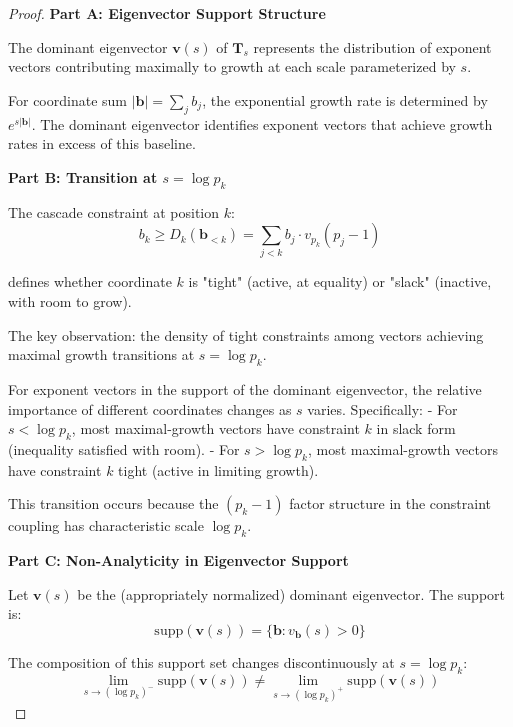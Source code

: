 \begin{proof}

\noindent \textbf{Part A: Eigenvector Support Structure}

The dominant eigenvector $\mathbf{v}(s)$ of $\mathbf{T}_s$ represents the distribution of exponent vectors contributing maximally to growth at each scale parameterized by $s$.

For coordinate sum $|\mathbf{b}| = \sum_j b_j$, the exponential growth rate is determined by $e^{s |\mathbf{b}|}$. The dominant eigenvector identifies exponent vectors that achieve growth rates in excess of this baseline.

\noindent \textbf{Part B: Transition at $s = \log p_k$}

The cascade constraint at position $k$:
\begin{equation}
b_k \geq D_k(\mathbf{b}_{<k}) = \sum_{j < k} b_j \cdot v_{p_k}(p_j - 1)
\end{equation}

defines whether coordinate $k$ is "tight" (active, at equality) or "slack" (inactive, with room to grow).

The key observation: the density of tight constraints among vectors achieving maximal growth transitions at $s = \log p_k$.

For exponent vectors in the support of the dominant eigenvector, the relative importance of different coordinates changes as $s$ varies. Specifically:
- For $s < \log p_k$, most maximal-growth vectors have constraint $k$ in slack form (inequality satisfied with room).
- For $s > \log p_k$, most maximal-growth vectors have constraint $k$ tight (active in limiting growth).

This transition occurs because the $(p_k-1)$ factor structure in the constraint coupling has characteristic scale $\log p_k$.

\noindent \textbf{Part C: Non-Analyticity in Eigenvector Support}

Let $\mathbf{v}(s)$ be the (appropriately normalized) dominant eigenvector. The support is:
\begin{equation}
\text{supp}(\mathbf{v}(s)) = \{\mathbf{b} : v_{\mathbf{b}}(s) > 0\}
\end{equation}

The composition of this support set changes discontinuously at $s = \log p_k$:
\begin{equation}
\lim_{s \to (\log p_k)^-} \text{supp}(\mathbf{v}(s)) \neq \lim_{s \to (\log p_k)^+} \text{supp}(\mathbf{v}(s))
\end{equation}


\end{proof}
